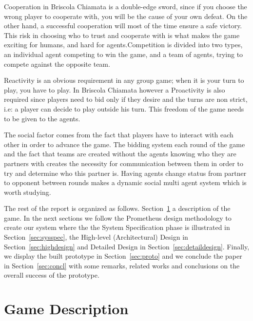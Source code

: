 \documentclass[a4paper]{article}
\begin{document}
Cooperation in Briscola Chiamata is a double-edge sword, since if you choose the wrong player to cooperate with, you will be the cause of your own defeat. On the other hand, a successful cooperation will most of the time ensure a safe victory. This risk in choosing who to trust and cooperate with is what makes the game exciting for humans, and hard for agents.Competition is divided into two types, an individual agent competing to win the game, and a team of agents, trying to compete against the opposite team.

Reactivity is an obvious requirement in any group game; when it is your turn to play, you have to play. In Briscola Chiamata however a Proactivity is also required since players need to bid only if they desire and the turns are non strict, i.e: a player can decide to play outside his turn. This freedom of the game needs to be given to the agents.

The social factor comes from the fact that players have to interact with each other in order to advance the game. The bidding system each round of the game and the fact that teams are created without the agents knowing who they are partners with creates the necessity for communication between them in order to try and determine who this partner is. Having agents change status from partner to opponent between rounds makes a dynamic social multi agent system which is worth studying.

The rest of the report is organized as follows. Section~\ref{sec:gamedescr} a description of the game. In the next sections we follow the Prometheus design methodology to create our system where the the System Specification phase is illustrated in Section~\ref{sec:sysspec}, the High-level (Architectural) Design in Section~\ref{sec:highdesign} and Detailed Design in Section~\ref{sec:detaildesign}. Finally, we display the built prototype in Section~\ref{sec:proto} and we conclude the paper in Section~\ref{sec:concl} with some remarks, related works and conclusions on the overall success of the prototype.

\section{Game Description}\label{sec:gamedescr}
\end{document}
